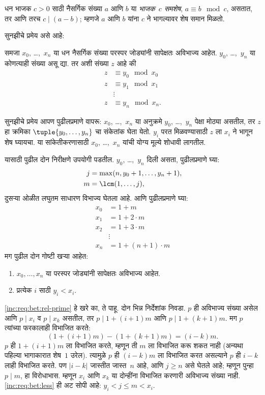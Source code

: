 \begin{defn}
धन भाजक $c>0$ साठी नैसर्गिक संख्या $a$ आणि $b$ या \emph{भाजक~$c$ समशेष},
$a \equiv b \mod c$, असतात, तर आणि तरच
$c \mid (a-b)$; म्हणजे $a$ आणि $b$ यांना $c$ ने भागल्यावर
शेष समान मिळतो.

\end{defn}

सुनझीचे प्रमेय असे आहे:
\begin{thm}
समजा $x_0$, \dots,~$x_n$ या धन नैसर्गिक संख्या परस्पर जोड्यांनी सापेक्षतः
अविभाज्य आहेत. $y_0$, \dots,~$y_n$ या कोणत्याही संख्या असू द्या.
तर अशी संख्या $z$ आहे की
\begin{align*}
z & \equiv y_0 \mod x_0 \\
z & \equiv y_1 \mod x_1 \\
& \vdots  \\
z & \equiv y_n \mod x_n.
\end{align*}
\end{thm}

सुनझीचे प्रमेय आपण पुढीलप्रमाणे वापरू: $x_0$, \dots,~$x_n$
या अनुक्रमे $y_0$, \dots,~$y_n$ पेक्षा मोठ्या असतील, तर
$z$ हा क्रमिका $\tuple{y_0, \dots,y_n}$ चा संकेतांक घेता येतो.
$y_i$ परत मिळवण्यासाठी $z$ ला $x_i$ ने भागून शेष घ्यायचा.
या सांकेतीकरणासाठी $x_0$, \dots,~$x_n$ यांची योग्य मूल्ये
शोधावी लागतील.

यासाठी पुढील दोन निरीक्षणे उपयोगी पडतील. $y_0$, \dots,~$y_n$
दिली असता, पुढीलप्रमाणे घ्या:
\begin{align*}
j &= \max(n, y_0 + 1, \dots, y_n + 1), \\
m &= \lcm(1,\dots,j),
\end{align*}
दुसऱ्या ओळीत लघुतम साधारण विभाज्य घेतला आहे.
आणि पुढीलप्रमाणे घ्या:
\begin{align*}
x_0 & = 1 + m \\
x_1 & = 1 + 2 \cdot m \\
x_2 & = 1 + 3 \cdot m \\
& \vdots  \\
x_n & = 1 + (n+1) \cdot m
\end{align*}
मग पुढील दोन गोष्टी खऱ्या आहेत:
\begin{enumerate}
\item\label{inc:req:bet:rel-prime} $x_0,\dots,x_n$ या परस्पर जोड्यांनी
  सापेक्षतः अविभाज्य आहेत.
\item\label{inc:req:bet:less} प्रत्येक $i$ साठी $y_i < x_i$.
\end{enumerate}
\ref{inc:req:bet:rel-prime} हे खरे का, ते पाहू. दोन भिन्न निर्देशांक
निवडा. $p$ ही अविभाज्य संख्या
असेल आणि $p \mid x_i$ व $p \mid x_k$ असतील, तर
$p \mid 1 + (i+1) m$ आणि $p \mid 1 + (k+1) m$.
मग $p$ त्यांच्या फरकालाही विभाजित करते:
\[(1 + (i+1)m) - (1+ (k+1)m) = (i-k) m.
\]
$p$ ही $1 + (i+1)m$ ला विभाजित करते, म्हणून ती $m$ ला
विभाजित करू शकत नाही (अन्यथा पहिल्या भागाकारात शेष~$1$
उरेल). त्यामुळे $p$ ही $(i-k)m$ ला विभाजित करत असल्याने
$p$ ही $i-k$ लाही विभाजित करते. पण $\left|i-k\right|$ जास्तीत
जास्त~$n$ आहे, आणि $j \geq n$ असे घेतले आहे; म्हणून
पुन्हा $p \mid m$, हा विरोधाभास. म्हणून $x_i$ आणि
$x_k$ या दोन्हींना विभाजित करणारी अविभाज्य संख्या नाही.
\ref{inc:req:bet:less} ही अट सोपी आहे: $y_i < j \leq m < x_i$.


